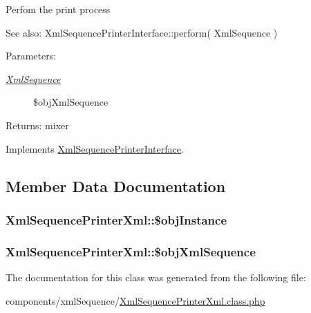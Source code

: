 Perfom the print process

\begin{Desc}
\item[See also:]XmlSequencePrinterInterface::perform( XmlSequence ) \end{Desc}
\begin{Desc}
\item[Parameters:]
\begin{description}
\item[{\em \hyperlink{class_xml_sequence}{XmlSequence}}]\$objXmlSequence \end{description}
\end{Desc}
\begin{Desc}
\item[Returns:]mixer \end{Desc}


Implements \hyperlink{interface_xml_sequence_printer_interface_68a8066e69c402d49dd0a16a22cfcb6b}{XmlSequencePrinterInterface}.

\subsection{Member Data Documentation}
\hypertarget{class_xml_sequence_printer_xml_e633ac1e15f76e165c7a6d599de36231}{
\subsubsection[{\$objInstance}]{\setlength{\rightskip}{0pt plus 5cm}XmlSequencePrinterXml::\$objInstance}}
\label{class_xml_sequence_printer_xml_e633ac1e15f76e165c7a6d599de36231}


\hypertarget{class_xml_sequence_printer_xml_c24cec88eff41ddb99b215601cd6f5d8}{
\subsubsection[{\$objXmlSequence}]{\setlength{\rightskip}{0pt plus 5cm}XmlSequencePrinterXml::\$objXmlSequence}}
\label{class_xml_sequence_printer_xml_c24cec88eff41ddb99b215601cd6f5d8}




The documentation for this class was generated from the following file:\begin{CompactItemize}
\item 
components/xmlSequence/\hyperlink{_xml_sequence_printer_xml_8class_8php}{XmlSequencePrinterXml.class.php}\end{CompactItemize}
